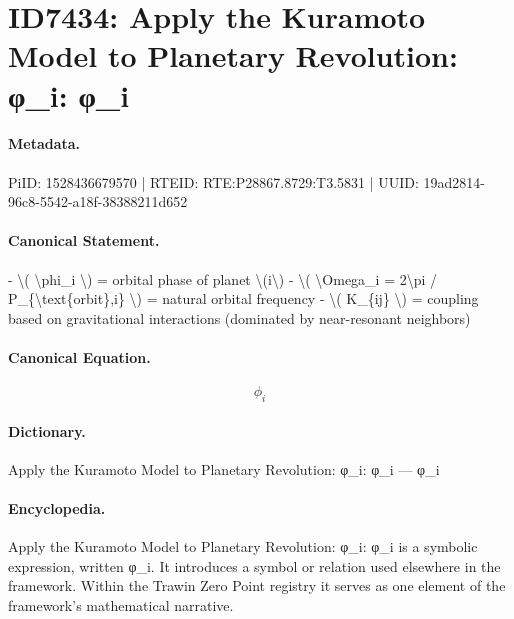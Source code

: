 \section*{ID7434: Apply the Kuramoto Model to Planetary Revolution: φ\_i: φ\_i}
\paragraph{Metadata.}
PiID: 1528436679570 | RTEID: RTE:P28867.8729:T3.5831 | UUID: 19ad2814-96c8-5542-a18f-38388211d652

\paragraph{Canonical Statement.}
- \textbackslash{}( \textbackslash{}phi\_i \textbackslash{}) = orbital phase of planet \textbackslash{}(i\textbackslash{}) - \textbackslash{}( \textbackslash{}Omega\_i = 2\textbackslash{}pi / P\_\{\textbackslash{}text\{orbit\},i\} \textbackslash{}) = natural orbital frequency - \textbackslash{}( K\_\{ij\} \textbackslash{}) = coupling based on gravitational interactions (dominated by near-resonant neighbors)

\paragraph{Canonical Equation.}
\[
\phi_i
\]

\paragraph{Dictionary.}
Apply the Kuramoto Model to Planetary Revolution: φ\_i: φ\_i — φ\_i

\paragraph{Encyclopedia.}
Apply the Kuramoto Model to Planetary Revolution: φ\_i: φ\_i is a symbolic expression, written φ\_i. It introduces a symbol or relation used elsewhere in the framework. Within the Trawin Zero Point registry it serves as one element of the framework's mathematical narrative.
